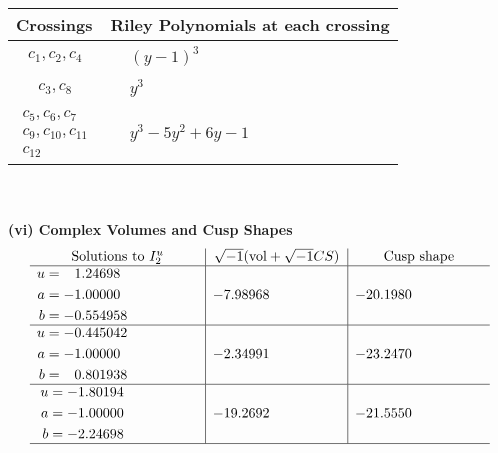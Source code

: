 \documentclass[1p]{elsarticle_modified}
\theoremstyle{definition}
\newcommand{\I}{\sqrt{-1}}
\begin{document}
\begin{tabular}{m{50pt}|m{274pt}}
Crossings & \hspace{64pt}Riley Polynomials at each crossing \\
\hline $$\begin{aligned}c_{1},c_{2},c_{4}\end{aligned}$$&$\begin{aligned}
&(y-1)^3
\end{aligned}$\\
\hline $$\begin{aligned}c_{3},c_{8}\end{aligned}$$&$\begin{aligned}
&y^3
\end{aligned}$\\
\hline $$\begin{aligned}c_{5},c_{6},c_{7}\\c_{9},c_{10},c_{11}\\c_{12}\end{aligned}$$&$\begin{aligned}
&y^3-5 y^2+6 y-1
\end{aligned}$\\
\hline
\end{tabular}\\~\\
\newpage\flushleft \textbf{(vi) Complex Volumes and Cusp Shapes}
$$\begin{array}{c|c|c}  
\text{Solutions to }I^u_{2}& \I (\text{vol} + \sqrt{-1}CS) & \text{Cusp shape}\\
 \hline 
\begin{aligned}
u &= \phantom{-}1.24698\phantom{ +0.000000I} \\
a &= -1.00000\phantom{ +0.000000I} \\
b &= -0.554958\phantom{ +0.000000I}\end{aligned}
 & -7.98968\phantom{ +0.000000I} & -20.1980\phantom{ +0.000000I} \\ \hline\begin{aligned}
u &= -0.445042\phantom{ +0.000000I} \\
a &= -1.00000\phantom{ +0.000000I} \\
b &= \phantom{-}0.801938\phantom{ +0.000000I}\end{aligned}
 & -2.34991\phantom{ +0.000000I} & -23.2470\phantom{ +0.000000I} \\ \hline\begin{aligned}
u &= -1.80194\phantom{ +0.000000I} \\
a &= -1.00000\phantom{ +0.000000I} \\
b &= -2.24698\phantom{ +0.000000I}\end{aligned}
 & -19.2692\phantom{ +0.000000I} & -21.5550\phantom{ +0.000000I}\\
 \hline 
 \end{array}$$\newpage
\end{document}
